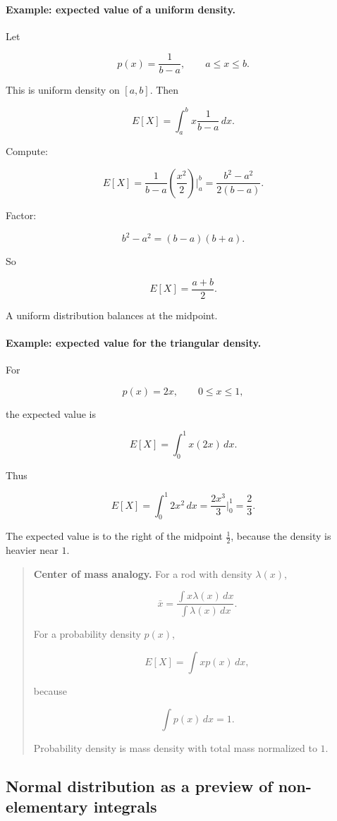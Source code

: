 \paragraph{Example: expected value of a uniform density.}
Let

\[
p(x)=\frac1{b-a},
\qquad a\le x\le b.
\]

This is uniform density on \([a,b]\).  Then

\[
E[X]=\int_a^b x\frac1{b-a}\,dx.
\]

Compute:

\[
E[X]
=
\frac1{b-a}\left(\frac{x^2}{2}\right)\Big|_a^b
=
\frac{b^2-a^2}{2(b-a)}.
\]

Factor:

\[
b^2-a^2=(b-a)(b+a).
\]

So

\[
E[X]
=
\boxed{
\frac{a+b}{2}
}.
\]

A uniform distribution balances at the midpoint.

\paragraph{Example: expected value for the triangular density.}
For

\[
p(x)=2x,
\qquad 0\le x\le1,
\]

the expected value is

\[
E[X]=\int_0^1 x(2x)\,dx.
\]

Thus

\[
E[X]=\int_0^1 2x^2\,dx
=
\frac{2x^3}{3}\Big|_0^1
=
\boxed{\frac23}.
\]

The expected value is to the right of the midpoint \(\frac12\), because the density is
heavier near \(1\).

\begin{quote}
\textbf{Center of mass analogy.}
For a rod with density \(\lambda(x)\),

\[
\bar x=\frac{\int x\lambda(x)\,dx}{\int \lambda(x)\,dx}.
\]

For a probability density \(p(x)\),

\[
E[X]=\int x p(x)\,dx,
\]

because

\[
\int p(x)\,dx=1.
\]

Probability density is mass density with total mass normalized to \(1\).
\end{quote}

\subsection{Normal distribution as a preview of non-elementary integrals}
\label{subsec:normal-distribution-preview}


